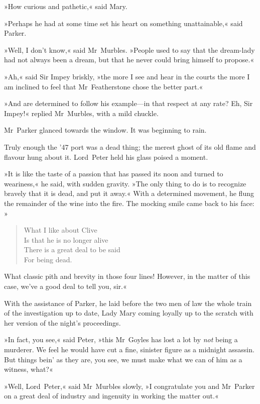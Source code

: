 »How curious and pathetic,« said Mary.

»Perhaps he had at some time set his heart on something unattainable,« said Parker.

»Well, I don't know,« said Mr~Murbles. »People used to say that the dream-lady had not always been a dream, but that he never could bring himself to propose.«

»Ah,« said Sir Impey briskly, »the more I see and hear in the courts the more I am inclined to feel that Mr~Featherstone chose the better part.«

»And are determined to follow his example—in that respect at any rate?  Eh, Sir Impey!« replied Mr~Murbles, with a mild chuckle.

Mr~Parker glanced towards the window. It was beginning to rain.

Truly enough the '47 port was a dead thing; the merest ghost of its old flame and flavour hung about it. Lord~Peter held his glass poised a moment.

»It is like the taste of a passion that has passed its noon and turned to weariness,« he said, with sudden gravity. »The only thing to do is to recognize bravely that it is dead, and put it away.« With a determined movement, he flung the remainder of the wine into the fire.  The mocking smile came back to his face: 
»\begin{verse}
What I like about Clive\\
Is that he is no longer alive\longdash \\
There is a great deal to be said\\
For being dead.\\
\end{verse}

What classic pith and brevity in those four lines! However, in the matter of this case, we've a good deal to tell you, sir.«

With the assistance of Parker, he laid before the two men of law the whole train of the investigation up to date, Lady Mary coming loyally up to the scratch with her version of the night's proceedings.

»In fact, you see,« said Peter, »this Mr~Goyles has lost a lot by \textit{not} being a murderer. We feel he would have cut a fine, sinister figure as a midnight assassin. But things bein' as they are, you see, we must make what we can of him as a witness, what?«

»Well, Lord~Peter,« said Mr~Murbles slowly, »I congratulate you and Mr~Parker on a great deal of industry and ingenuity in working the matter out.«

